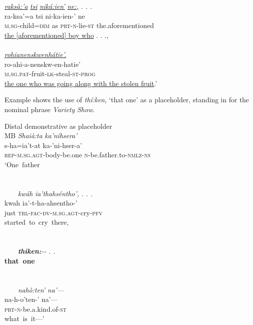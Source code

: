 \documentclass[output=paper]{langscibook}
\begin{document}
\glll \uline{\textit{raksà:’a}}          \uline{\textit{tsi}}  \uline{\textit{niká:ien’}}    \uline{\textit{ne:,}}  \textit{. . .}\\
ra-ksa’=a        tsi  ni-ka-ien-’    ne {}\\
\textsc{m.sg-}child=\textsc{dim}  as    \textsc{prt-n-}lie-\textsc{st}  the.aforementioned {}\\
\glt \uline{the [aforementioned] boy who}  . . .,  \\
~\\
\glll \uline{\textit{rohianenskwenhátie’.}}\\
ro-ahi-a-nenskw-en-hatie’\\
\textsc{m.sg.pat}{}-fruit-\textsc{lk}{}-steal-\textsc{st-prog}\\
\glt \uline{the one who was going along with the stolen fruit}.’
\z

Example  shows the use of \textit{thí:ken}, ‘that one’ as a placeholder, standing in for the nominal phrase \textit{Variety Show}.


\ea%
\label{ex:mithun:14}
Distal demonstrative as placeholder\\
\gllll \textup{MB}   \textit{Shaià:ta}                    \textit{ka’níhsera’} \\
{} s-ha=ia’t-at                ka-’ni-hser-a’  \\
{} \textsc{rep-m.sg.agt-}body-be.one  \textsc{n}{}-be.father.to-\textsc{nmlz-ns}  \\
{} {‘One~father}\\~\\~\\

\gllll \textcolor{white}{MB} \textit{kwáh}  \textit{ia’thahséntho’,}    \textit{. . .}\\
{} kwah  ia’-t-ha-ahsentho-’\\
{} just    \textsc{trl-fac-dv-m.sg.agt-}cry-\textsc{pfv}\\
{} {started~to~cry~there,}\\~\\~\\

\gll \textcolor{white}{MB} \textbf{\textit{thiken:}}\textit{{}-{}-}  \textit{. .}\\
{} \textbf{that~one} {}\\~\\~\\

\gllll \textcolor{white}{MB} \textit{nahò:ten’}          \textit{na’—}\\
{} na-h-o’ten-’        na’—\\
{} \textsc{prt-n-}be.a.kind.of-\textsc{st} {}\\
{} {what~is~it—'}\\~\\~\\
\end{document}
